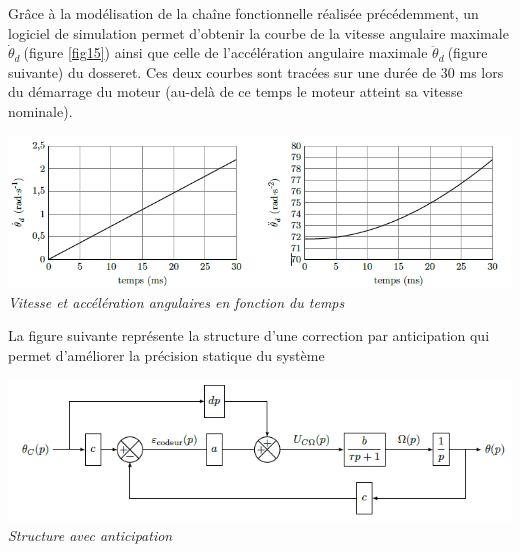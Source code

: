 \documentclass[10pt,fleqn]{article} %
\begin{document}
\begin{multicols}{2}
Grâce à la modélisation de la chaîne fonctionnelle réalisée
précédemment, un logiciel de simulation permet d'obtenir la courbe de la
vitesse angulaire maximale \({\dot{\theta}}_{d}\ \)(figure \ref{fig15}) ainsi que
celle de l'accélération angulaire maximale
\({\ddot{\theta}}_{d}\ \)(figure suivante) du dosseret. Ces deux courbes sont
tracées sur une durée de 30 ms lors du démarrage du moteur (au-delà de
ce temps le moteur atteint sa vitesse nominale).

\begin{center}
\includegraphics[width=1.0\linewidth]{images/image16.png}
\textit{Vitesse et accélération angulaires en fonction du
temps \label{fig15}}
\end{center}


%
%  
%  


La figure suivante représente la structure d'une correction par anticipation
qui permet d'améliorer la précision statique du système

\begin{center}
\includegraphics[width=1.0\linewidth]{images/image17.png}
\textit{Structure avec anticipation \label{fig16}}
\end{center}


\end{multicols}
\end{document}
